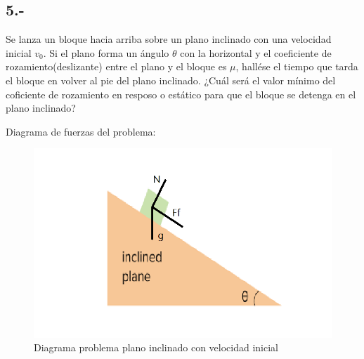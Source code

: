 \documentclass{article}
\begin{document}
\subsection*{5.-}
Se lanza un bloque hacia arriba sobre un plano inclinado con una velocidad inicial 
$v_0$. Si el plano forma un ángulo $\theta$ con la horizontal y el coeficiente de 
rozamiento(deslizante) entre el plano y el bloque es $\mu$, hallése el tiempo que
tarda el bloque en volver al pie del plano inclinado. ¿Cuál será el valor mínimo 
del coficiente de rozamiento en resposo o estático para que el bloque se detenga 
en el plano inclinado?
\begin{tcolorbox}
    Diagrama de fuerzas del problema:
    \begin{figure}[H]
        \centering 
        \includegraphics[scale=0.4]{p5_plano}
        \caption{Diagrama problema plano inclinado con velocidad inicial}   
    \end{figure}
\end{tcolorbox}
\end{document}
